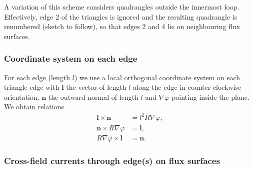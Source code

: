 \documentclass[a4paper, 10pt, english]{article}
\let\temp\vartheta
\let\vartheta\theta
\let\theta\temp
\let\temp\varphi
\let\varphi\phi
\let\phi\temp
\let\vec\symbf
\begin{document}




A variation of this scheme considers quadrangles outside the innermost loop. Effectively, edge 2 of the triangles is ignored and the resulting quadrangle is renumbered (sketch to follow), so that edges 2 and 4 lie on neighbouring flux surfaces.

\subsubsection{Coordinate system on each edge}

For each edge (length $l$) we use a local orthogonal coordinate system on each triangle edge with $\vec{l}$ the vector of length $l$ along the edge in counter-clockwise orientation, $\vec{n}$ the outward normal of length $l$ and $\nabla \phi$ pointing inside the plane. We obtain relations
\begin{align}
  \vec{l} \times \vec{n} &= l^{2} R \nabla \phi, \\
  \vec{n} \times R \nabla \phi &= \vec{l}, \\
  R \nabla \phi \times \vec{l} &= \vec{n}.
\end{align}

\subsubsection{Cross-field currents through edge(s) on flux surfaces}
\end{document}
